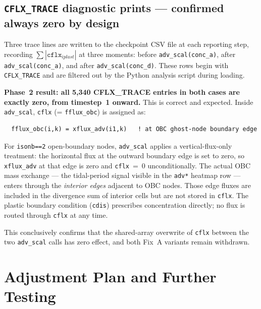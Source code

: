 \documentclass[11pt]{article}
\begin{document}
\subsection*{\texttt{CFLX\_TRACE} diagnostic prints --- confirmed always zero by design}

Three trace lines are written to the checkpoint CSV file at each reporting step,
recording $\sum|\texttt{cflx}_{iplast}|$ at three moments:
before \texttt{adv\_scal(conc\_a)}, after \texttt{adv\_scal(conc\_a)}, and
after \texttt{adv\_scal(conc\_d)}.
These rows begin with \texttt{CFLX\_TRACE} and are filtered out by the Python
analysis script during loading.

\textbf{Phase~2 result: all 5{,}340 CFLX\_TRACE entries in both cases are
exactly zero, from timestep~1 onward.}
This is correct and expected.  Inside \texttt{adv\_scal},
\texttt{cflx} (= \texttt{fflux\_obc}) is assigned as:
\begin{verbatim}
  fflux_obc(i,k) = xflux_adv(i1,k)   ! at OBC ghost-node boundary edge
\end{verbatim}
For \texttt{isonb==2} open-boundary nodes, \texttt{adv\_scal} applies a
vertical-flux-only treatment: the horizontal flux at the outward boundary
edge is set to zero, so \texttt{xflux\_adv} at that edge is zero
and \texttt{cflx}~=~0 unconditionally.
The actual OBC mass exchange --- the tidal-period signal visible in the
\texttt{adv*} heatmap row --- enters through the \emph{interior edges}
adjacent to OBC nodes.  Those edge fluxes are included in the divergence
sum of interior cells but are not stored in \texttt{cflx}.
The plastic boundary condition (\texttt{cdis}) prescribes concentration
directly; no flux is routed through \texttt{cflx} at any time.

This conclusively confirms that the shared-array overwrite of \texttt{cflx}
between the two \texttt{adv\_scal} calls has zero effect, and both Fix~A
variants remain withdrawn.

\section*{Adjustment Plan and Further Testing}
\end{document}
